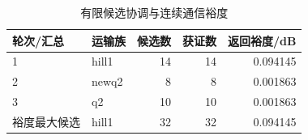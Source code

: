 \begin{table}[H]\centering\normalsize
\caption{有限候选协调与连续通信裕度}\label{tab:q3_coordination_audit}
\begin{tabular}{llrrr}
\toprule
轮次/汇总 & 运输族 & 候选数 & 获证数 & 返回裕度/dB\\\midrule
1 & hill1 & 14 & 14 & 0.094145\\
2 & newq2 & 8 & 8 & 0.001863\\
3 & q2 & 10 & 10 & 0.001863\\
裕度最大候选 & hill1 & 32 & 32 & 0.094145\\
\bottomrule\end{tabular}
\end{table}
